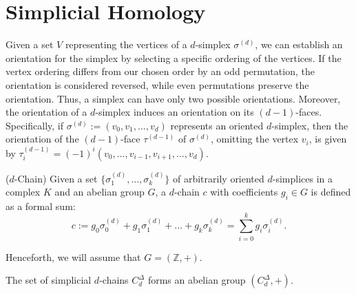\section{Simplicial Homology}
\label{Simplicial Homology}
Given a set $V$ representing the vertices of a $d$-simplex $\sigma^{(d)}$, we can establish an orientation for the simplex by selecting a specific ordering of the vertices. If the vertex ordering differs from our chosen order by an odd permutation, the orientation is considered reversed, while even permutations preserve the orientation. Thus, a simplex can have only two possible orientations. Moreover, the orientation of a $d$-simplex induces an orientation on its $(d-1)$-faces. Specifically, if $\sigma^{(d)}:= (v_0, v_1, \ldots, v_d)$ represents an oriented $d$-simplex, then the orientation of the $(d-1)$-face $\tau^{(d-1)}$ of $\sigma^{(d)}$, omitting the vertex $v_i$, is given by $\tau_i^{(d-1)} = (-1)^i (v_0, \ldots, v_{i-1}, v_{i+1}, \ldots, v_d)$.

\begin{definition}
    {($d$-Chain) \cite[\S 2.3]{zomorodian2004computing}}
    \label{$d$-Chain}
    Given a set $\{\sigma_{1}^{(d)}, \ldots, \sigma_{k}^{(d)}\}$ of arbitrarily oriented $d$-simplices in a complex $K$ and an abelian group $G$, a $d$-chain $c$ with coefficients $g_i \in G$ is defined as a formal sum:
    \begin{equation}
        c := g_{0} \sigma^{(d)}_{0} + g_{1} \sigma^{(d)}_{1} + \ldots + g_{k} \sigma^{(d)}_{k} = \sum_{i=0}^{k} g_{i} \sigma^{(d)}_{i}.
    \end{equation}
\end{definition}

Henceforth, we will assume that $G = (\mathbb{Z}, +)$.

\begin{lemma}
    The set of simplicial $d$-chains $C^{\Delta}_d$ forms an abelian group $(C^{\Delta}_d, +)$.
\end{lemma}

